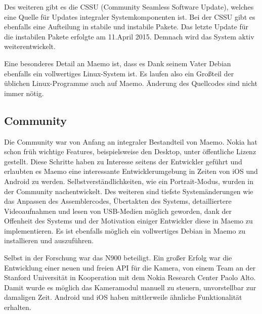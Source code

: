 Des weiteren gibt es die CSSU\thinspace\cite{online:maemo-cssu} (Community Seamless Software Update), welches eine Quelle für Updates integraler Systemkomponenten ist. Bei der CSSU gibt es ebenfalls eine Aufteilung in stabile und instabile Pakete. Das letzte Update für die instabilen Pakete erfolgte am 11.\@ April 2015\thinspace\cite{online:maemo-cssuchangelog}. Demnach wird das System aktiv weiterentwickelt.

Eine besonderes Detail an Maemo ist, dass es Dank seinem Vater Debian ebenfalls ein vollwertiges Linux-System ist. Es laufen also ein Großteil der üblichen Linux-Programme auch auf Maemo. Änderung des Quellcodes sind nicht immer nötig.
\newline

\subsection{Community}
Die Community war von Anfang an integraler Bestandteil von Maemo. Nokia hat schon früh wichtige Features, beispielsweise den Desktop, unter öffentliche Lizenz gestellt\thinspace\cite{online:maemo-hildon}. Diese Schritte haben zu Interesse seitens der Entwickler geführt und erlaubten es Maemo eine interessante Entwicklerumgebung in Zeiten von iOS und Android zu werden. Selbstverständlichkeiten, wie ein Portrait-Modus, wurden in der Community nachentwickelt\thinspace\cite{online:maemo-portrait}. Des weiteren sind tiefste Systemänderungen wie das Anpassen des Assemblercodes\thinspace\cite{online:maemo-thumb}, Übertakten des Systems\thinspace\cite{online:maemo-overclocking}, detailliertere Videoaufnahmen\thinspace\cite{online:maemo-hdvideo} und lesen von \mbox{USB-Medien}\thinspace\cite{online:maemo-usbhost}  möglich geworden, dank der Offenheit des Systems und der Motivation einiger Entwickler diese in Maemo zu implementieren. Es ist ebenfalls möglich ein vollwertiges Debian in Maemo zu installieren und auszuführen\thinspace\cite{online:maemo-easydebian}\thinspace\cite{online:maemo-easydebianwiki}.

Selbst in der Forschung war das N900 beteiligt. Ein großer Erfolg war die Entwicklung einer neuen und freien API für die Kamera, von einem Team an der Stanford Universität in Kooperation mit dem Nokia Research Center Paolo Alto\thinspace\cite{online:maemo-fcam}. Damit wurde es möglich das Kameramodul manuell zu steuern, unvorstellbar zur damaligen Zeit. Android und iOS haben mittlerweile ähnliche Funktionalität erhalten\thinspace\cite{online:maemo-fcamlegacy}.

